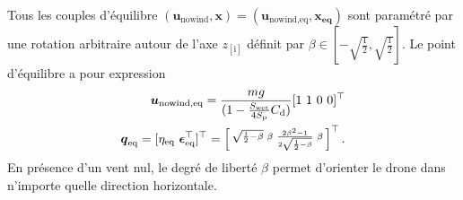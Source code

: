         Tous les couples d'équilibre $(\boldsymbol{u}_{\text{nowind}}, \boldsymbol{x}) = (\boldsymbol{u}_{\text{nowind},\text{eq}}, \boldsymbol{x_{\text{eq}}})$ sont paramétré par une rotation arbitraire autour de l'axe $z_{[\text{i}]}$ définit par $\beta \in \left[-\sqrt{\frac{1}{2}},\sqrt{\frac{1}{2}}\right]$. Le point d'équilibre a pour expression
        \begin{subequations}
            \label{eq:equilibria}
            \begin{align}
                \label{eq:bar_u}
                \boldsymbol{u}_{\text{nowind},\text{eq}} = \frac{mg}{( 1-\frac{S_{\text{wet}}}{4S_{\text{p}}} C_{\text{d}})} [1~1~0~0]^\top\\
                \boldsymbol{q}_{\text{eq}} = [\eta_{\text{eq}} ~\boldsymbol{\epsilon}_{\text{eq}}^\top]^\top = \left[ \begin{smallmatrix}\sqrt{\frac{1}{2}-\beta} & \beta & \frac{2\beta^{2}-1}{2\sqrt{\frac{1}{2}-\beta}} & \beta \end{smallmatrix} \right]^\top.
            \end{align}
        \end{subequations}
        En présence d'un vent nul, le degré de liberté $\beta$ permet d'orienter le drone dans n'importe quelle direction horizontale.

